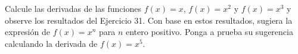 \item Calcule las derivadas de las funciones $f(x) = x$, $f(x) = x^2$ y $f(x) = x^3$ y observe los resultados del Ejercicio 31. Con base en estos resultados, sugiera la expresión de $f(x) = x^n$ para $n$ entero positivo. Ponga a prueba su sugerencia calculando la derivada de $f(x) = x^5$.
